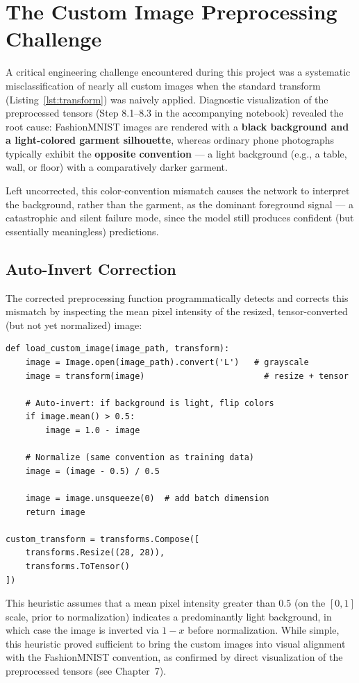\documentclass[12pt,a4paper]{report}
\begin{document}
\section{The Custom Image Preprocessing Challenge}
\label{sec:invert}
A critical engineering challenge encountered during this project was a systematic misclassification of nearly all custom images when the standard transform (Listing~\ref{lst:transform}) was naively applied. Diagnostic visualization of the preprocessed tensors (Step 8.1--8.3 in the accompanying notebook) revealed the root cause: FashionMNIST images are rendered with a \textbf{black background and a light-colored garment silhouette}, whereas ordinary phone photographs typically exhibit the \textbf{opposite convention} — a light background (e.g., a table, wall, or floor) with a comparatively darker garment.

Left uncorrected, this color-convention mismatch causes the network to interpret the background, rather than the garment, as the dominant foreground signal — a catastrophic and silent failure mode, since the model still produces confident (but essentially meaningless) predictions.

\subsection{Auto-Invert Correction}
The corrected preprocessing function programmatically detects and corrects this mismatch by inspecting the mean pixel intensity of the resized, tensor-converted (but not yet normalized) image:

\begin{lstlisting}[caption={Auto-invert preprocessing for custom images}, label={lst:autoinvert}]
def load_custom_image(image_path, transform):
    image = Image.open(image_path).convert('L')   # grayscale
    image = transform(image)                        # resize + tensor

    # Auto-invert: if background is light, flip colors
    if image.mean() > 0.5:
        image = 1.0 - image

    # Normalize (same convention as training data)
    image = (image - 0.5) / 0.5

    image = image.unsqueeze(0)  # add batch dimension
    return image

custom_transform = transforms.Compose([
    transforms.Resize((28, 28)),
    transforms.ToTensor()
])
\end{lstlisting}

This heuristic assumes that a mean pixel intensity greater than $0.5$ (on the $[0,1]$ scale, prior to normalization) indicates a predominantly light background, in which case the image is inverted via $1 - x$ before normalization. While simple, this heuristic proved sufficient to bring the custom images into visual alignment with the FashionMNIST convention, as confirmed by direct visualization of the preprocessed tensors (see Chapter~7).
\end{document}
